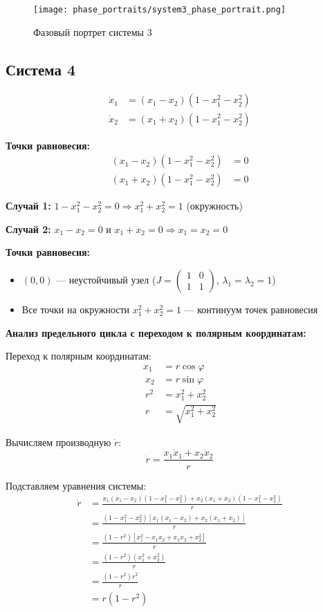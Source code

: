\begin{figure}[H]
\centering
\texttt{[image: phase\_portraits/system3\_phase\_portrait.png]}
\caption{Фазовый портрет системы 3}
\label{fig:system3_phase_portrait}
\end{figure}

\subsection*{Система 4}

\begin{align}
\dot{x}_1 &= (x_1 - x_2)(1 - x_1^2 - x_2^2) \\
\dot{x}_2 &= (x_1 + x_2)(1 - x_1^2 - x_2^2)
\end{align}

\textbf{Точки равновесия:}
\begin{align}
(x_1 - x_2)(1 - x_1^2 - x_2^2) &= 0 \\
(x_1 + x_2)(1 - x_1^2 - x_2^2) &= 0
\end{align}

\textbf{Случай 1:} $1 - x_1^2 - x_2^2 = 0 \Rightarrow x_1^2 + x_2^2 = 1$ (окружность)

\textbf{Случай 2:} $x_1 - x_2 = 0$ и $x_1 + x_2 = 0 \Rightarrow x_1 = x_2 = 0$

\textbf{Точки равновесия:}
\begin{itemize}
\item $(0, 0)$ --- неустойчивый узел ($J = \begin{pmatrix} 1 & 0 \\ 1 & 1 \end{pmatrix}$, $\lambda_1 = \lambda_2 = 1$)
\item Все точки на окружности $x_1^2 + x_2^2 = 1$ --- континуум точек равновесия
\end{itemize}

\textbf{Анализ предельного цикла с переходом к полярным координатам:}

Переход к полярным координатам:
\begin{align}
x_1 &= r\cos\varphi \\\
x_2 &= r\sin\varphi \\\
r^2 &= x_1^2 + x_2^2 \\\
r &= \sqrt{x_1^2 + x_2^2}
\end{align}

Вычисляем производную $\dot{r}$:
$$\dot{r} = \frac{x_1\dot{x}_1 + x_2\dot{x}_2}{r}$$

Подставляем уравнения системы:
\begin{align}
\dot{r} &= \frac{x_1(x_1 - x_2)(1 - x_1^2 - x_2^2) + x_2(x_1 + x_2)(1 - x_1^2 - x_2^2)}{r} \\\
&= \frac{(1 - x_1^2 - x_2^2)[x_1(x_1 - x_2) + x_2(x_1 + x_2)]}{r} \\\
&= \frac{(1 - r^2)[x_1^2 - x_1x_2 + x_1x_2 + x_2^2]}{r} \\\
&= \frac{(1 - r^2)(x_1^2 + x_2^2)}{r} \\\
&= \frac{(1 - r^2)r^2}{r} \\\
&= r(1 - r^2)
\end{align}

